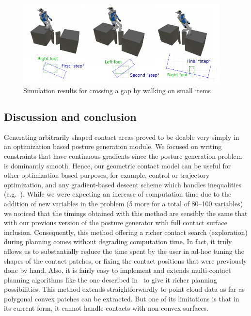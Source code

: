 \begin{figure}[!htb]
  \centering
  \includegraphics[width=0.95\textwidth]{riviere3steps.pdf}
  \caption{Simulation results for crossing a gap by walking on small items}
\label{fig:riviere}
\end{figure}



\subsection{Discussion and conclusion}


Generating arbitrarily shaped contact areas proved to be doable very simply in an optimization based posture generation module.
We focused on writing constraints that have continuous gradients since the posture generation problem is dominantly smooth.
Hence, our geometric contact model can be useful for other optimization based purposes, for example, control or trajectory optimization, and any gradient-based descent scheme which handles inequalities (e.g.~\cite{escande:icra:2010}).
While we were expecting an increase of computation time due to the addition of new variables in the problem (5 more for a total of 80--100 variables)
we noticed that the timings obtained with this method are sensibly the same that with our previous version of the posture generator with full contact surface inclusion.
Consequently, this method offering a richer contact search (exploration) during planning comes without degrading computation time.
In fact, it truly allows us to substantially reduce the time spent by the user in ad-hoc tuning the shapes of the contact patches, or fixing the contact positions that were previously done by hand.
Also, it is fairly easy to implement and extends multi-contact planning algorithms like the one described in~\cite{escande:ras:2013} to give it richer planning possibilities.
This method extends straightforwardly to point cloud data as far as polygonal convex patches can be extracted.
But one of its limitations is that in its current form, it cannot handle contacts with non-convex surfaces.

